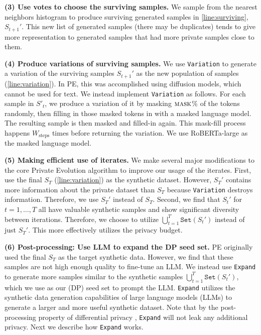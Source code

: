 \textbf{(3) Use votes to choose the surviving samples.} We sample from the nearest neighbors histogram to produce surviving generated samples in \cref{line:surviving}, $S_{t+1}'$.  This new list of generated samples (there may be duplicates) tends to give more representation to generated samples that had more private samples close to them.

\textbf{(4) Produce variations of surviving samples.} We use \texttt{Variation} to generate a variation of the surviving samples $S_{t+1}'$ as the new population of samples (\cref{line:variation}). In PE, this was accomplished using diffusion models, which cannot be used for text.
We instead implement \texttt{Variation}  as follows. For each sample in $S'_t$, we produce a variation of it by masking $\textsc{mask}$\% of the tokens randomly, then filling in those masked tokens in with a masked language model. The resulting sample is then masked and filled-in again. This mask-fill process happens $W_{\text{steps}}$ times before returning the variation. We use RoBERTa-large \citep{roberta} as the masked language model.

\textbf{(5) Making efficient use of iterates.} We make several major modifications to the core Private Evolution algorithm to improve our usage of the iterates. First, \citet{lin2023differentially} use the final $S_T$ (\cref{line:variation}) as the synthetic dataset.  However, $S_T'$ contains more information about the private dataset than $S_T$ because \texttt{Variation} destroys information.  Therefore, we use $S_T'$ instead of $S_T$. Second, we find that $S_t'$ for $t=1,\dots,T$ all have valuable synthetic samples and show significant diversity between iterations.  Therefore, we choose to utilize $\bigcup_{t=1}^T \texttt{Set}(S_t')$  instead of just $S_T'$.  This more effectively utilizes the privacy budget.

\textbf{(6) Post-processing: Use LLM to expand the DP seed set.} 
PE originally used the final $S_T$ as the target synthetic data. 
However, we find that these samples are not high enough quality to fine-tune an LLM. 
We instead use \texttt{Expand} to generate more samples similar to the synthetic samples $\bigcup_{t=1}^T \texttt{Set}(S_t')$, which we use as our (DP) seed set to prompt the LLM.  \texttt{Expand} utilizes the synthetic data generation capabilities of large language models (LLMs) to generate a larger and more useful synthetic dataset.  Note that by the post-processing property of differential privacy \citep{dwork2006differential}, \texttt{Expand} will not leak any additional privacy.  Next we describe how \texttt{Expand} works.

